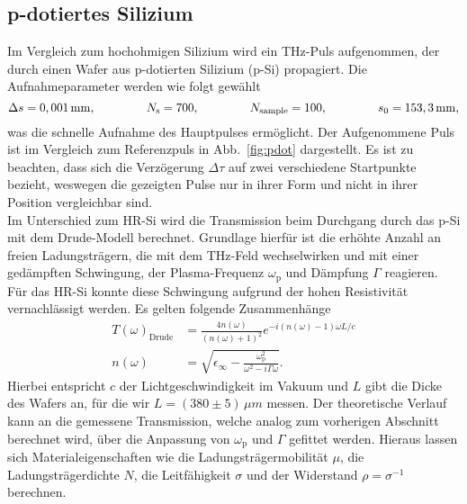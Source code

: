 \subsection{\label{sec:A23}p-dotiertes Silizium}
Im Vergleich zum hochohmigen Silizium wird ein THz-Puls aufgenommen, der durch einen Wafer aus 
p-dotierten Silizium (p-Si) propagiert. Die Aufnahmeparameter werden wie folgt gewählt
\begin{equation}
    \Delta s = 0,001\,\si{mm}, \hspace{1.5cm} N_{\text{s}} = 700, \hspace{1.5cm} N_{\text{sample}} = 100, \hspace{1.5cm} s_{0} = 153,3\,\si{mm},
\end{equation} 
was die schnelle Aufnahme des Hauptpulses ermöglicht. Der Aufgenommene Puls ist im Vergleich zum Referenzpuls in 
Abb.~\ref{fig:pdot} dargestellt. Es ist zu beachten, dass sich die Verzögerung $\Delta\tau$ auf zwei verschiedene 
Startpunkte bezieht, weswegen die gezeigten Pulse nur in ihrer Form und nicht in ihrer Position vergleichbar sind. \\ 
Im Unterschied zum HR-Si wird die Transmission beim Durchgang durch das p-Si mit dem Drude-Modell berechnet.
Grundlage hierfür ist die erhöhte Anzahl an freien Ladungsträgern, die mit dem THz-Feld 
wechselwirken und mit einer gedämpften Schwingung, der Plasma-Frequenz $\omega_{\text{p}}$ und 
Dämpfung $\Gamma$ reagieren. Für das HR-Si konnte diese Schwingung aufgrund der hohen 
Resistivität vernachlässigt werden. Es gelten folgende Zusammenhänge
\begin{align}
    T(\omega)_{\text{Drude}} &= \frac{4n(\omega)}{(n(\omega)+1)^{2}}e^{-i(n(\omega)-1)\omega L/c} \\
    n(\omega) &= \sqrt{\epsilon_{\infty} - \frac{\omega_{\text{p}}^{2}}{\omega^{2}-i\Gamma\omega}}.
\end{align}
Hierbei entspricht $c$ der Lichtgeschwindigkeit im Vakuum und $L$ gibt die Dicke des 
Wafers an, für die wir $L = (380\pm5)\,\si{\mu m}$ messen.
Der theoretische Verlauf kann an die gemessene Transmission, 
welche analog zum vorherigen Abschnitt berechnet wird, 
über die Anpassung von $\omega_{\text{p}}$ und $\Gamma$ gefittet werden. 
Hieraus lassen sich Materialeigenschaften wie die Ladungsträgermobilität $\mu$, 
die Ladungsträgerdichte $N$, die Leitfähigkeit $\sigma$ und der Widerstand 
$\rho = \sigma^{-1}$ berechnen.